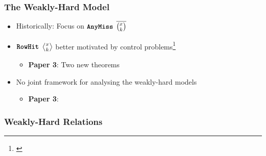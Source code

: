 \begin{frame}
    \frametitle{The Weakly-Hard Model}

    \begin{itemize}\setlength\itemsep{1em}
        \item Historically: Focus on $\texttt{\textbf{AnyMiss}}{}$ $\overline{\binom{x_{}}{k_{}}}$
        \item $\texttt{\textbf{RowHit}}{}$ $\rowhit{}$ better motivated by control problems\footnote{\cite{Linsenmayer:2021,Vreman:2021}}
            \begin{itemize}
                \item \textbf{Paper 3}: Two new theorems
            \end{itemize}
        \item No joint framework for analysing the weakly-hard models
            \begin{itemize}
                \item \textbf{Paper 3}: \tool{}
            \end{itemize}
    \end{itemize}
\end{frame}


\begin{frame}
    \frametitle{Weakly-Hard Relations}
    \begin{figure}[h]
        \centering
        \only<2>{}%
        \only<3>{}%
    \end{figure}
\end{frame}


